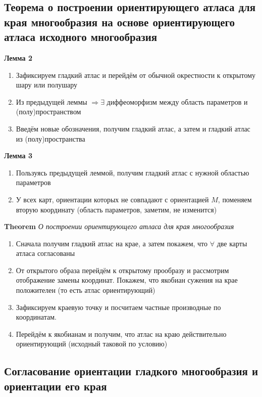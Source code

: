 \documentclass[a4paper, 14pt]{article}
\begin{document}
    \subsection{Теорема о построении ориентирующего атласа для края многообразия на основе ориентирующего атласа
    исходного многообразия}
    
    \textbf{Лемма 2}
    
    \begin{enumerate}
        \item Зафиксируем гладкий атлас и перейдём от обычной окрестности к открытому шару или полушару
        \item Из предыдущей леммы $\Rightarrow \exists$ диффеоморфизм между область параметров и (полу)пространством
        \item Введём новые обозначения, получим гладкий атлас, а затем и гладкий атлас из (полу)пространства
    \end{enumerate}
    
    \textbf{Лемма 3}
    
    \begin{enumerate}
        \item Пользуясь предыдущей леммой, получим гладкий атлас с нужной областью параметров
        \item У всех карт, ориентации которых не совпадают с ориентацией $M$, поменяем вторую координату (область
        параметров, заметим, не изменится)
    \end{enumerate}
    
    \textbf{Theorem} \textit{О построении ориентирующего атласа для края многообразия}
    
    \begin{enumerate}
        \item Сначала получим гладкий атлас на крае, а затем покажем, что $\forall$ две карты атласа согласованы
        \item От открытого образа перейдём к открытому прообразу и рассмотрим отображение замены координат.
        Покажем, что якобиан сужения на крае положителен (то есть атлас ориентирующий)
        \item Зафиксируем краевую точку и посчитаем частные производные по координатам.
        \item Перейдём к якобианам и получим, что атлас на краю действительно ориентирующий (исходный таковой по условию)
    \end{enumerate}
    
    \subsection{Согласование ориентации гладкого многообразия и ориентации его края}
    
\end{document}
